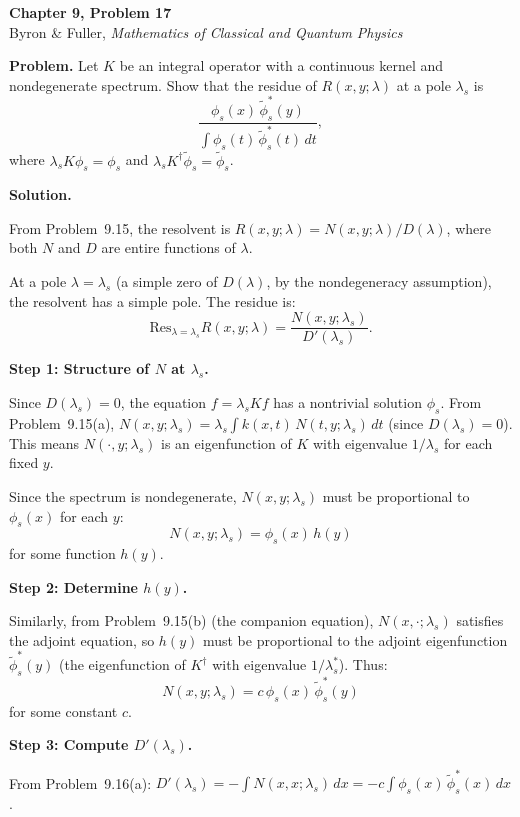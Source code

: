 \documentclass[12pt]{article}
\begin{document}
\begin{center}
{\Large\bfseries Chapter 9, Problem 17}\\[6pt]
Byron \& Fuller, \textit{Mathematics of Classical and Quantum Physics}
\end{center}

\bigskip

\textbf{Problem.} Let $K$ be an integral operator with a continuous kernel and nondegenerate spectrum. Show that the residue of $R(x,y;\lambda)$ at a pole $\lambda_s$ is
\[
\frac{\phi_s(x)\,\tilde{\phi}_s^*(y)}{\int \phi_s(t)\,\tilde{\phi}_s^*(t)\,dt},
\]
where $\lambda_s K\phi_s = \phi_s$ and $\lambda_s K^\dagger\tilde{\phi}_s = \tilde{\phi}_s$.

\bigskip
\textbf{Solution.}

From Problem~9.15, the resolvent is $R(x,y;\lambda) = N(x,y;\lambda)/D(\lambda)$, where both $N$ and $D$ are entire functions of $\lambda$.

At a pole $\lambda = \lambda_s$ (a simple zero of $D(\lambda)$, by the nondegeneracy assumption), the resolvent has a simple pole. The residue is:
\[
\text{Res}_{\lambda = \lambda_s} R(x,y;\lambda) = \frac{N(x,y;\lambda_s)}{D'(\lambda_s)}.
\]

\textbf{Step 1: Structure of $N$ at $\lambda_s$.}

Since $D(\lambda_s) = 0$, the equation $f = \lambda_s Kf$ has a nontrivial solution $\phi_s$. From Problem~9.15(a), $N(x,y;\lambda_s) = \lambda_s \int k(x,t)\,N(t,y;\lambda_s)\,dt$ (since $D(\lambda_s) = 0$). This means $N(\cdot, y; \lambda_s)$ is an eigenfunction of $K$ with eigenvalue $1/\lambda_s$ for each fixed $y$.

Since the spectrum is nondegenerate, $N(x,y;\lambda_s)$ must be proportional to $\phi_s(x)$ for each $y$:
\[
N(x,y;\lambda_s) = \phi_s(x)\,h(y)
\]
for some function $h(y)$.

\textbf{Step 2: Determine $h(y)$.}

Similarly, from Problem~9.15(b) (the companion equation), $N(x,\cdot;\lambda_s)$ satisfies the adjoint equation, so $h(y)$ must be proportional to the adjoint eigenfunction $\tilde{\phi}_s^*(y)$ (the eigenfunction of $K^\dagger$ with eigenvalue $1/\lambda_s^*$). Thus:
\[
N(x,y;\lambda_s) = c\,\phi_s(x)\,\tilde{\phi}_s^*(y)
\]
for some constant $c$.

\textbf{Step 3: Compute $D'(\lambda_s)$.}

From Problem~9.16(a): $D'(\lambda_s) = -\int N(x,x;\lambda_s)\,dx = -c\int\phi_s(x)\,\tilde{\phi}_s^*(x)\,dx$.
\end{document}
